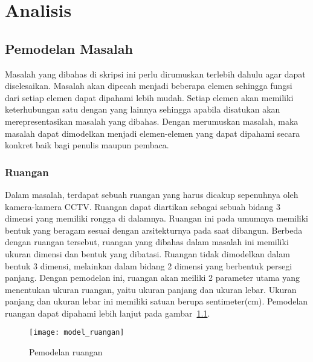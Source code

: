 \chapter{Analisis}

\section{Pemodelan Masalah}
Masalah yang dibahas di skripsi ini perlu dirumuskan terlebih dahulu agar dapat diselesaikan. Masalah akan dipecah menjadi beberapa elemen sehingga fungsi dari setiap elemen dapat dipahami lebih mudah. Setiap elemen akan memiliki keterhubungan satu dengan yang lainnya sehingga apabila disatukan akan merepresentasikan masalah yang dibahas. Dengan merumuskan masalah, maka masalah dapat dimodelkan menjadi elemen-elemen yang dapat dipahami secara konkret baik bagi penulis maupun pembaca.


\subsection{Ruangan}
Dalam masalah, terdapat sebuah ruangan yang harus dicakup sepenuhnya oleh kamera-kamera CCTV. Ruangan dapat diartikan sebagai sebuah bidang 3 dimensi yang memiliki rongga di dalamnya. Ruangan ini pada umumnya memiliki bentuk yang beragam sesuai dengan arsitekturnya pada saat dibangun. Berbeda dengan ruangan tersebut, ruangan yang dibahas dalam masalah ini memiliki ukuran dimensi dan bentuk yang dibatasi. Ruangan tidak dimodelkan dalam bentuk 3 dimensi, melainkan dalam bidang 2 dimensi yang berbentuk persegi panjang. Dengan pemodelan ini, ruangan akan meiliki 2 parameter utama yang menentukan ukuran ruangan, yaitu ukuran panjang dan ukuran lebar. Ukuran panjang dan ukuran lebar ini memiliki satuan berupa sentimeter(cm). Pemodelan ruangan dapat dipahami lebih lanjut pada gambar~\ref{fig:model_ruangan}.

\begin{figure}[H]
	\centering  
	\texttt{[image: model\_ruangan]}
	\caption[Pemodelan ruangan]{Pemodelan ruangan} 
	\label{fig:model_ruangan}
\end{figure}


